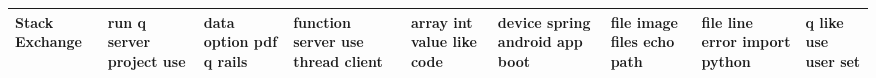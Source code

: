 \documentclass[11pt,a4paper]{article}
\begin{document}
\begin{appendices}
\begin{table*}[htp]
\begin{tiny}
\begin{tabular}{|p{}|p{}|p{}|p{}|p{}|p{}|p{}|p{}|p{}|}
Stack Exchange & run \newline q \newline server \newline project \newline use & data \newline option \newline pdf \newline q \newline rails & function \newline server \newline use \newline thread \newline client & array \newline int \newline value \newline like \newline code & device \newline spring \newline android \newline app \newline boot & file \newline image \newline files \newline echo \newline path & file \newline line \newline error \newline import \newline python & q \newline like \newline use \newline user \newline set\\\hline

\end{tabular}
\end{tiny}
\end{table*}
\end{appendices}
\end{document}
